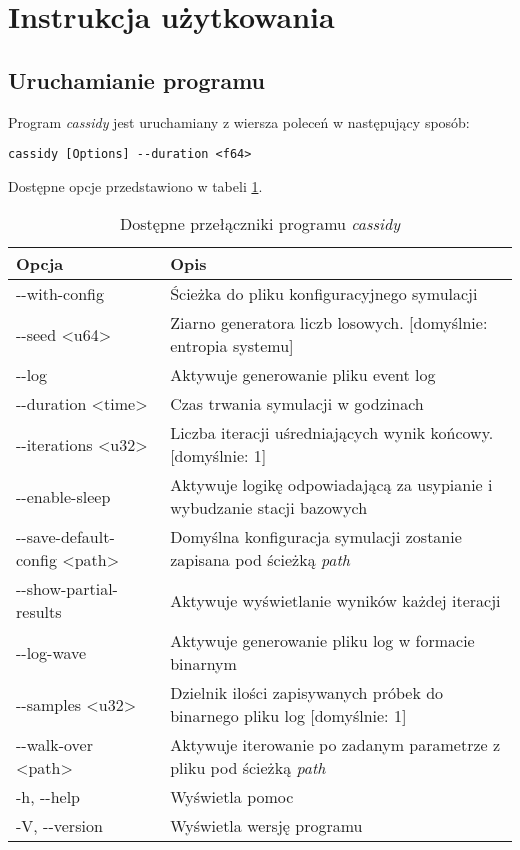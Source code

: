 \section{Instrukcja użytkowania}
\subsection{Uruchamianie programu}
Program \emph{cassidy} jest uruchamiany z wiersza poleceń w następujący sposób:
{
\selectfont 
\begin{verbatim}
cassidy [Options] --duration <f64>
\end{verbatim}
}

\noindent Dostępne opcje przedstawiono w tabeli \ref{options_table}.
\newline\newline
\begin{table}[h]
\caption{Dostępne przełączniki programu \emph{cassidy}}
\label{options_table}
\begin{center}
\selectfont
\renewcommand{\arraystretch}{1.5}
\begin{tabular}{|l|l|}
\hline 
Opcja & Opis \\ 
\hline 
-{}-with-config & Ścieżka do pliku konfiguracyjnego symulacji \\ 
\hline
-{}-seed <u64> & Ziarno generatora liczb losowych. [domyślnie: entropia systemu] \\
\hline
-{}-log & Aktywuje generowanie pliku event log \\
\hline
-{}-duration <time> & Czas trwania symulacji w godzinach \\
\hline
-{}-iterations <u32> & Liczba iteracji uśredniających wynik końcowy. [domyślnie: 1]\\
\hline
-{}-enable-sleep & Aktywuje logikę odpowiadającą za usypianie i wybudzanie stacji bazowych \\
\hline
-{}-save-default-config <path> & Domyślna konfiguracja symulacji zostanie zapisana pod ścieżką \emph{path} \\
\hline
-{}-show-partial-results & Aktywuje wyświetlanie wyników każdej iteracji \\
\hline
-{}-log-wave & Aktywuje generowanie pliku log w formacie binarnym \\
\hline
-{}-samples <u32> & Dzielnik ilości zapisywanych próbek do binarnego pliku log [domyślnie: 1] \\
\hline
-{}-walk-over <path> & Aktywuje iterowanie po zadanym parametrze z pliku pod ścieżką \emph{path} \\
\hline
-h, -{}-help & Wyświetla pomoc \\
\hline
-V, -{}-version & Wyświetla wersję programu  \\
\hline
\end{tabular}
\end{center}
\end{table}

